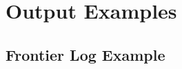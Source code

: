 \chapter{Output Examples}

\section{Frontier Log Example}
\label{app:frontier-log}
\inputminted[fontsize=\scriptsize]{text}{Appendix2/example.frontier.txt}

